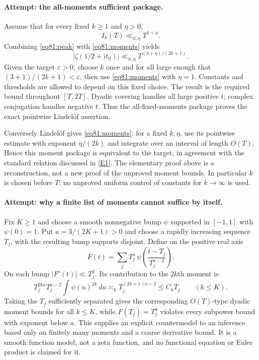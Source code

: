 \documentclass[11pt,a4paper]{article}
\numberwithin{equation}{section}
\newcommand{\eref}[2]{\hyperlink{extra:#1:#2}{[E#2]}}
\begin{document}
\paragraph{Attempt: the all-moments sufficient package.}
Assume that for every fixed $k\geq1$ and $\eta>0$,
\begin{equation}\label{eq81:moments}
 I_k(T)\ll_{k,\eta}T^{1+\eta}.
\end{equation}
Combining \eqref{eq81:peak} with \eqref{eq81:moments} yields
\[
 |\zeta(1/2+it_0)|\ll_{k,\eta}T^{(3+\eta)/(2k+1)}.
\]
Given the target $\varepsilon>0$, choose $k$ once and for all large enough
that $(3+1)/(2k+1)<\varepsilon$, then use \eqref{eq81:moments} with
$\eta=1$. Constants and thresholds are allowed to depend on this fixed
choice. The result is the required bound throughout $[T,2T]$.
Dyadic covering handles all large positive $t$; complex conjugation handles
negative $t$. Thus the all-fixed-moments package proves the exact pointwise
Lindel\"of assertion.

Conversely Lindel\"of gives \eqref{eq81:moments}: for a fixed $k,\eta$,
use its pointwise estimate with exponent $\eta/(2k)$ and integrate over
an interval of length $O(T)$. Hence this moment package is equivalent to
the target, in agreement with the standard relation discussed in
\eref{81}{1}. The elementary proof above is a reconstruction, not a new
proof of the unproved moment bounds. In particular $k$ is chosen before
$T$; no unproved uniform control of constants for $k\to\infty$ is used.

\paragraph{Attempt: why a finite list of moments cannot suffice by itself.}
Fix $K\geq1$ and choose a smooth nonnegative bump $\psi$ supported in
$[-1,1]$ with $\psi(0)=1$. Put $a=3/(2K+1)>0$ and choose a rapidly
increasing sequence $T_j$, with the resulting bump supports disjoint.
Define on the positive real axis
\[
 F(t)=\sum_j T_j^a\,
       \psi\left(\frac{t-T_j}{T_j^{a-2}}\right).
\]
On each bump $|F'(t)|\ll T_j^2$. Its contribution to the $2k$th moment is
\[
 T_j^{2ka}T_j^{a-2}\int\psi(u)^{2k}\,du
       \asymp_k T_j^{(2k+1)a-2}\leq C_kT_j
          \qquad(k\leq K).
\]
Taking the $T_j$ sufficiently separated gives the corresponding
$O(T)$-type dyadic moment bounds for all $k\leq K$, while
$F(T_j)=T_j^a$ violates every subpower bound with exponent below $a$.
This supplies an explicit countermodel to an inference based only on
finitely many moments and a coarse derivative bound. It is a smooth
function model, not a zeta function, and no functional equation or Euler
product is claimed for it.
\end{document}
